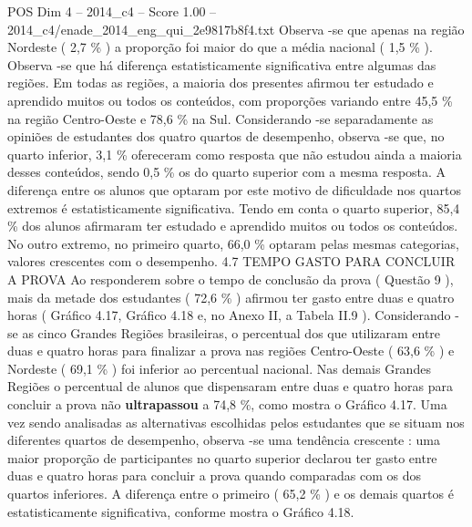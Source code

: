 \begin{textsample}{POS Dim 4 – 2014\_c4 – Score 1.00 – 2014\_c4/enade\_2014\_eng\_qui\_2e9817b8f4.txt}
Observa -se que apenas na região Nordeste ( 2,7 \% ) a proporção foi maior do que a média nacional ( 1,5 \% ).
Observa -se que há diferença estatisticamente significativa entre algumas das regiões.
Em todas as regiões, a maioria dos presentes afirmou ter estudado e aprendido muitos ou todos os conteúdos, com proporções variando entre 45,5 \% na região Centro-Oeste e 78,6 \% na Sul.
Considerando -se separadamente as opiniões de estudantes dos quatro quartos de desempenho, observa -se que, no quarto inferior, 3,1 \% ofereceram como resposta que não estudou ainda a maioria desses conteúdos, sendo 0,5 \% os do quarto superior com a mesma resposta.
A diferença entre os alunos que optaram por este motivo de dificuldade nos quartos extremos é estatisticamente significativa.
Tendo em conta o quarto superior, 85,4 \% dos alunos afirmaram ter estudado e aprendido muitos ou todos os conteúdos.
No outro extremo, no primeiro quarto, 66,0 \% optaram pelas mesmas categorias, valores crescentes com o desempenho. 4.7 TEMPO GASTO PARA CONCLUIR A PROVA Ao responderem sobre o tempo de conclusão da prova ( Questão 9 ), mais da metade dos estudantes ( 72,6 \% ) afirmou ter gasto entre duas e quatro horas ( Gráfico 4.17, Gráfico 4.18 e, no Anexo II, a Tabela II.9 ).
Considerando -se as cinco Grandes Regiões brasileiras, o percentual dos que utilizaram entre duas e quatro horas para finalizar a prova nas regiões Centro-Oeste ( 63,6 \% ) e Nordeste ( 69,1 \% ) foi inferior ao percentual nacional.
Nas demais Grandes Regiões o percentual de alunos que dispensaram entre duas e quatro horas para concluir a prova não \textbf{ultrapassou} a 74,8 \%, como mostra o Gráfico 4.17.
Uma vez sendo analisadas as alternativas escolhidas pelos estudantes que se situam nos diferentes quartos de desempenho, observa -se uma tendência crescente : uma maior proporção de participantes no quarto superior declarou ter gasto entre duas e quatro horas para concluir a prova quando comparadas com os dos quartos inferiores.
A diferença entre o primeiro ( 65,2 \% ) e os demais quartos é estatisticamente significativa, conforme mostra o Gráfico 4.18.

\end{textsample}
